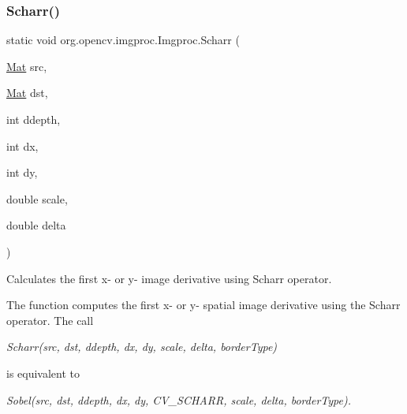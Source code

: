 \subsubsection{\texorpdfstring{Scharr()}{Scharr()}\hspace{0.1cm}{\footnotesize\ttfamily [2/3]}}
{\footnotesize\ttfamily static void org.\+opencv.\+imgproc.\+Imgproc.\+Scharr (\begin{DoxyParamCaption}\item[{\mbox{\hyperlink{classorg_1_1opencv_1_1core_1_1_mat}{Mat}}}]{src,  }\item[{\mbox{\hyperlink{classorg_1_1opencv_1_1core_1_1_mat}{Mat}}}]{dst,  }\item[{int}]{ddepth,  }\item[{int}]{dx,  }\item[{int}]{dy,  }\item[{double}]{scale,  }\item[{double}]{delta }\end{DoxyParamCaption})\hspace{0.3cm}{\ttfamily [static]}}

Calculates the first x-\/ or y-\/ image derivative using Scharr operator.

The function computes the first x-\/ or y-\/ spatial image derivative using the Scharr operator. The call

{\itshape Scharr(src, dst, ddepth, dx, dy, scale, delta, border\+Type)}

is equivalent to

{\itshape Sobel(src, dst, ddepth, dx, dy, C\+V\+\_\+\+S\+C\+H\+A\+RR, scale, delta, border\+Type).}


